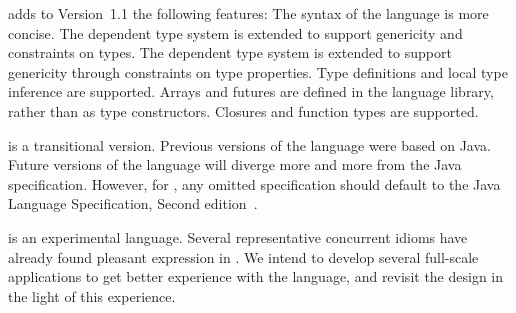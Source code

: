 {}\XtenCurrVer{} adds to Version~1.1 the following features:
The syntax of the language is more concise.
\iftypeparams
The dependent type system is extended to support genericity and
constraints on types.
\else
The dependent type system is extended to support genericity through
constraints on type properties.
\fi
Type definitions and local type inference are
supported.  Arrays and futures are defined in the language library, rather than
as type constructors.  Closures and function types are supported.

\XtenCurrVer{} is a transitional version.  Previous versions
of the language were based on Java.  Future versions of the language will 
diverge more and more from the Java specification.
However, for \XtenCurrVer{}, any omitted specification should default
to
the Java Language Specification, Second edition~\cite{jls2}.

{}\Xten{} is an experimental language.  Several representative
concurrent idioms have already found pleasant expression in \Xten. We
intend to develop several full-scale applications to get better
experience with the language, and revisit the design in the light of
this experience.


